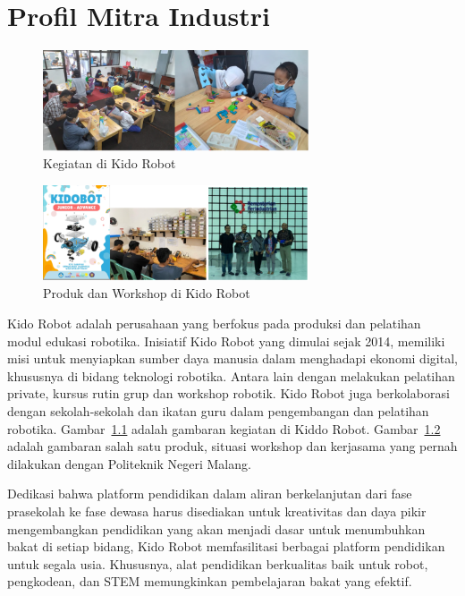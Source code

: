 \chapter{Profil Mitra Industri}
\begin{figure}[!htb]
    \centering
    \includegraphics[width=0.7\textwidth]{figures/KegiatanKiddo.png}
    \caption{Kegiatan di Kido Robot}
    \label{fig:kegiatankiddo}
\end{figure}
\begin{figure}[!htb]
    \centering
    \includegraphics[width=0.7\textwidth]{figures/ProdukWorkshopKiddo.png}
    \caption{Produk dan Workshop di Kido Robot}
    \label{fig:produkkiddo}
\end{figure}
Kido Robot adalah perusahaan yang berfokus pada produksi dan pelatihan modul edukasi robotika. Inisiatif Kido Robot yang dimulai sejak 2014, memiliki misi untuk menyiapkan sumber daya manusia dalam menghadapi ekonomi digital, khususnya di bidang teknologi robotika. Antara lain dengan melakukan pelatihan private, kursus rutin grup dan workshop robotik. Kido Robot juga berkolaborasi dengan sekolah-sekolah dan ikatan guru dalam pengembangan dan pelatihan robotika. Gambar~\ref{fig:kegiatankiddo}  adalah gambaran kegiatan di Kiddo Robot. Gambar~\ref{fig:produkkiddo} adalah gambaran salah satu produk, situasi workshop dan kerjasama yang pernah dilakukan dengan Politeknik Negeri Malang. 

Dedikasi bahwa platform pendidikan dalam aliran berkelanjutan dari fase prasekolah ke fase dewasa harus disediakan untuk kreativitas dan daya pikir mengembangkan pendidikan yang akan menjadi dasar untuk menumbuhkan bakat di setiap bidang, Kido Robot memfasilitasi berbagai platform pendidikan untuk segala usia. Khususnya, alat pendidikan berkualitas baik untuk robot, pengkodean, dan STEM memungkinkan pembelajaran bakat yang efektif. 

